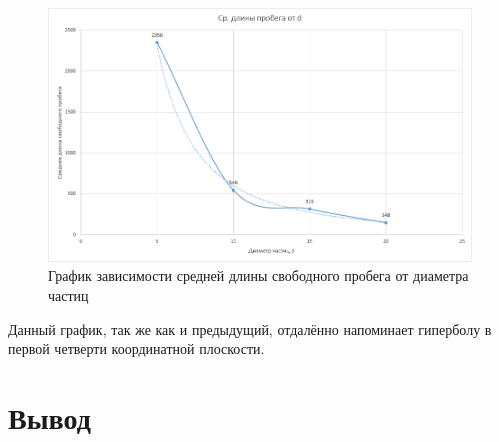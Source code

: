 \documentclass[a4paper,12pt]{article}
\begin{document}
\begin{figure}[h!]
	\begin{center}
		\includegraphics[scale=0.4]{3}
	\end{center}
	\caption{График зависимости средней длины свободного пробега от диаметра частиц}
\end{figure}

Данный график, так же как и предыдущий, отдалённо напоминает гиперболу в первой четверти координатной плоскости.

\newpage
\section{Вывод}
\end{document}
